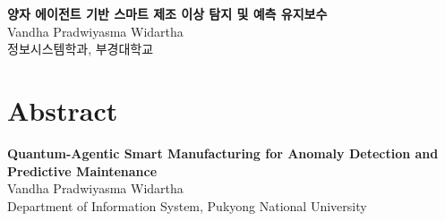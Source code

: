 \documentclass[11pt]{report}
\begin{document}

\thispagestyle{empty}


\newpage


\newpage


\newpage
{}
\listoftables

\newpage
{}
\listoffigures

\newpage
% 
\vspace{1em}
\begingroup
\let\clearpage\relax
\let\cleardoublepage\relax
\begin{center}
{\large \textbf{양자 에이전트 기반 스마트 제조 이상 탐지 및 예측 유지보수}}\\[0.8em]
Vandha Pradwiyasma Widartha\\[0.2em]
정보시스템학과, 부경대학교\\[0.2em]
\end{center}
\vspace{1em}
\chapter*{Abstract}

\endgroup

\newpage
\vspace{1em}
\begingroup
\let\clearpage\relax
\let\cleardoublepage\relax
\begin{center}
{\large \textbf{Quantum-Agentic Smart Manufacturing for Anomaly Detection and Predictive Maintenance}}\\[0.8em]
Vandha Pradwiyasma Widartha\\[0.2em]
Department of Information System, Pukyong National University\\[0.2em]
\end{center}
\vspace{1em}
\end{document}
